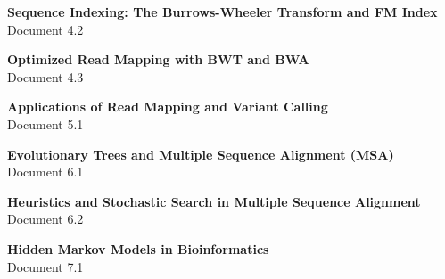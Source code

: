 \documentclass[a4paper,11pt]{article}
\newcounter{docnum}
\begin{document}

\newpage
{}
\setcounter{section}{0}
\begin{center}\Huge\textbf{Sequence Indexing: The Burrows-Wheeler Transform and FM Index}\\[0.2cm]\Large Document 4.2\end{center}\vspace{2cm}

\newpage
{}
\setcounter{section}{0}
\begin{center}\Huge\textbf{Optimized Read Mapping with BWT and BWA}\\[0.2cm]\Large Document 4.3\end{center}\vspace{2cm}

\newpage
{}
\setcounter{section}{0}
\begin{center}\Huge\textbf{Applications of Read Mapping and Variant Calling}\\[0.2cm]\Large Document 5.1\end{center}\vspace{2cm}

\newpage
{}
\setcounter{section}{0}
\begin{center}\Huge\textbf{Evolutionary Trees and Multiple Sequence Alignment (MSA)}\\[0.2cm]\Large Document 6.1\end{center}\vspace{2cm}

\newpage
{}
\setcounter{section}{0}
\begin{center}\Huge\textbf{Heuristics and Stochastic Search in Multiple Sequence Alignment}\\[0.2cm]\Large Document 6.2\end{center}\vspace{2cm}

\newpage
{}
\setcounter{section}{0}
\begin{center}\Huge\textbf{Hidden Markov Models in Bioinformatics}\\[0.2cm]\Large Document 7.1\end{center}\vspace{2cm}

\end{document}
